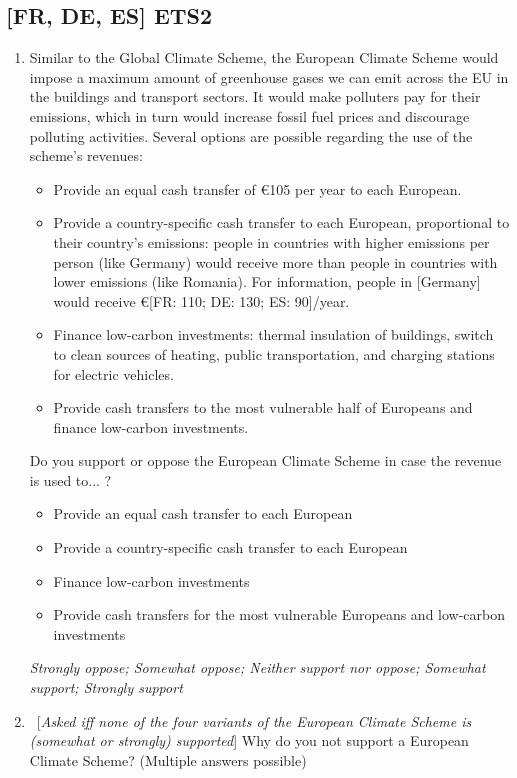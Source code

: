 \subsection*{[FR, DE, ES] ETS2}
\begin{enumerate}[resume] 
    \item Similar to the Global Climate Scheme, the European Climate Scheme would impose a maximum amount of greenhouse gases we can emit across the EU in the buildings and transport sectors. It would make polluters pay for their emissions, which in turn would increase fossil fuel prices and discourage polluting activities. Several options are possible regarding the use of the scheme's revenues:
    \begin{itemize}
        \item Provide an equal cash transfer of \euro{}105 per year to each European.
        \item Provide a country-specific cash transfer to each European, proportional to their country's emissions: people in countries with higher emissions per person (like Germany) would receive more than people in countries with lower emissions (like Romania). For information, people in [Germany] would receive \euro{}[FR: 110; DE: 130; ES: 90]/year.
        \item Finance low-carbon investments: thermal insulation of buildings, switch to clean sources of heating, public transportation, and charging stations for electric vehicles.
        \item Provide cash transfers to the most vulnerable half of Europeans and finance low-carbon investments. 
    \end{itemize}     	 	 	 
    Do you support or oppose the European Climate Scheme in case the revenue is used to... ?
    \begin{itemize}
        \item Provide an equal cash transfer to each European 
        \item Provide a country-specific cash transfer to each European 
        \item Finance low-carbon investments 
        \item Provide cash transfers for the most vulnerable Europeans and low-carbon investments 
    \end{itemize}
    \textit{Strongly oppose; Somewhat oppose; Neither support nor oppose; Somewhat support; Strongly support}
    \item ~[\textit{Asked iff none of the four variants of the European Climate Scheme is (somewhat or strongly) supported}] Why do you not support a European Climate Scheme? (Multiple answers possible)

\end{enumerate}
